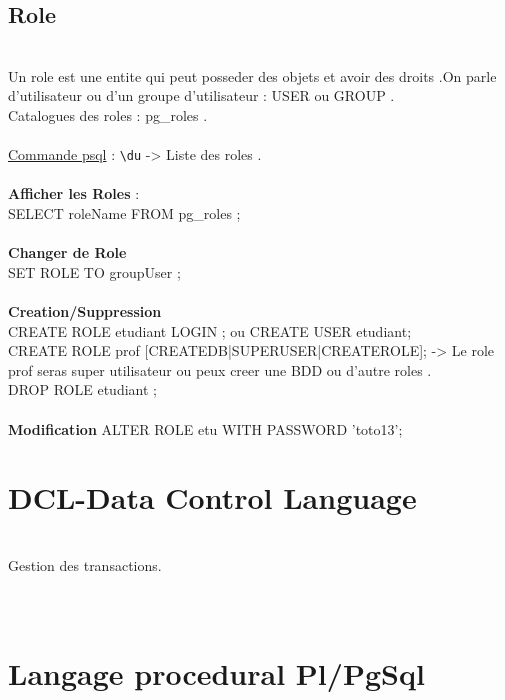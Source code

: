 \documentclass[a4paper,12pt,openany]{book}
\begin{document}
\section{Role}
\\
Un role est une entite qui peut posseder des objets et avoir des droits .On parle d'utilisateur ou d'un groupe d'utilisateur : USER ou GROUP .\\
Catalogues des roles : pg\_roles .\\
\\
\underline{Commande psql} : \verb+\du+ -> Liste des roles .\\
\\
\textbf{Afficher les Roles} : \\
SELECT roleName FROM pg\_roles ;\\
\\
\textbf{Changer de Role}\\
SET ROLE TO groupUser ;\\
\\
\textbf{Creation/Suppression} \\
CREATE ROLE etudiant LOGIN ; ou CREATE USER etudiant;\\
CREATE ROLE prof [CREATEDB|SUPERUSER|CREATEROLE]; -> Le role prof seras super utilisateur ou peux creer une BDD ou d'autre roles .\\
DROP ROLE etudiant ;\\
\\
\textbf{Modification}
ALTER ROLE etu WITH PASSWORD 'toto13';


\chapter{DCL-Data Control Language}
\\
Gestion des transactions.\\
\\

\\


\chapter{Langage procedural Pl/PgSql}
\end{document}
